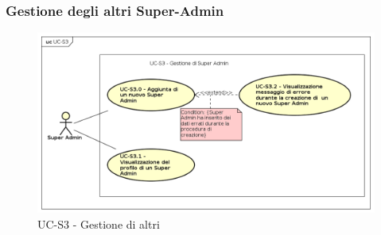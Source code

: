         
      
        
         
        
     

\subsubsection{Gestione degli altri Super-Admin}
    \begin{figure}[H]
      \begin{center}
        \includegraphics[width=12cm]{res/img/UCSuperadmin/UC-S3.png}
      \caption{UC-S3 - Gestione di altri }
      \end{center} 
    \end{figure}    
    
